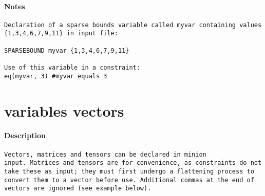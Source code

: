 \paragraph{Notes}
{\footnotesize
\begin{verbatim}
Declaration of a sparse bounds variable called myvar containing values
{1,3,4,6,7,9,11} in input file:

SPARSEBOUND myvar {1,3,4,6,7,9,11}

Use of this variable in a constraint:
eq(myvar, 3) #myvar equals 3
\end{verbatim}
}
\section{variables vectors}
\paragraph{Description}
{\footnotesize
\begin{verbatim}
Vectors, matrices and tensors can be declared in minion
input. Matrices and tensors are for convenience, as constraints do not
take these as input; they must first undergo a flattening process to
convert them to a vector before use. Additional commas at the end of 
vectors are ignored (see example below).
\end{verbatim}
}
